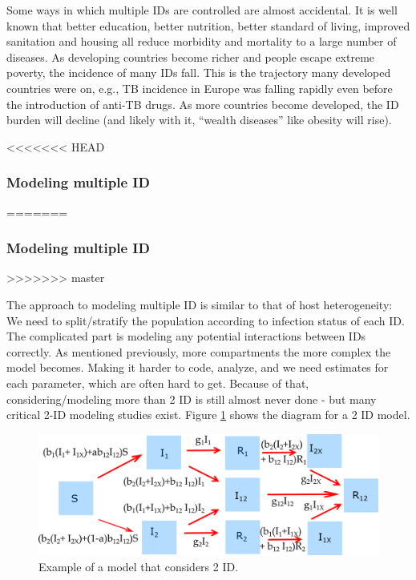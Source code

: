 \documentclass[]{book}
\theoremstyle{definition}
\theoremstyle{definition}
\theoremstyle{definition}
\theoremstyle{remark}
\begin{document}
Some ways in which multiple IDs are controlled are almost accidental. It
is well known that better education, better nutrition, better standard
of living, improved sanitation and housing all reduce morbidity and
mortality to a large number of diseases. As developing countries become
richer and people escape extreme poverty, the incidence of many IDs
fall. This is the trajectory many developed countries were on, e.g., TB
incidence in Europe was falling rapidly even before the introduction of
anti-TB drugs. As more countries become developed, the ID burden will
decline (and likely with it, ``wealth diseases'' like obesity will
rise).

<<<<<<< HEAD
\hypertarget{myadvancedbox}{%
\subsubsection{Modeling multiple ID}\label{myadvancedbox}}
=======
\subsubsection{Modeling multiple ID}\label{myadvancedbox}
>>>>>>> master

The approach to modeling multiple ID is similar to that of host
heterogeneity: We need to split/stratify the population according to
infection status of each ID. The complicated part is modeling any
potential interactions between IDs correctly. As mentioned previously,
more compartments the more complex the model becomes. Making it harder
to code, analyze, and we need estimates for each parameter, which are
often hard to get. Because of that, considering/modeling more than 2 ID
is still almost never done - but many critical 2-ID modeling studies
exist. Figure \ref{fig:coinfection} shows the diagram for a 2 ID model.

\begin{figure}
\centering
\includegraphics{./images/multipathogenmodel.png}
\caption{\label{fig:coinfection}Example of a model that considers 2 ID.}
\end{figure}
\end{document}

